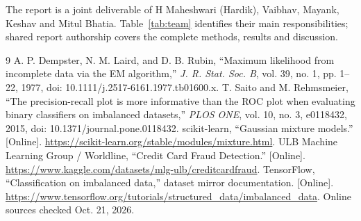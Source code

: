 \documentclass[conference]{IEEEtran}
\begin{document}
The report is a joint deliverable of H Maheshwari (Hardik), Vaibhav, Mayank, Keshav and Mitul Bhatia. Table~\ref{tab:team} identifies their main responsibilities; shared report authorship covers the complete methods, results and discussion.

\newpage
\begin{thebibliography}{9}
 A. P. Dempster, N. M. Laird, and D. B. Rubin, ``Maximum likelihood from incomplete data via the EM algorithm,'' \emph{J. R. Stat. Soc. B}, vol. 39, no. 1, pp. 1--22, 1977, doi: 10.1111/j.2517-6161.1977.tb01600.x.
 T. Saito and M. Rehmsmeier, ``The precision-recall plot is more informative than the ROC plot when evaluating binary classifiers on imbalanced datasets,'' \emph{PLOS ONE}, vol. 10, no. 3, e0118432, 2015, doi: 10.1371/journal.pone.0118432.
 scikit-learn, ``Gaussian mixture models.'' [Online]. \url{https://scikit-learn.org/stable/modules/mixture.html}.
 ULB Machine Learning Group / Worldline, ``Credit Card Fraud Detection.'' [Online]. \url{https://www.kaggle.com/datasets/mlg-ulb/creditcardfraud}.
 TensorFlow, ``Classification on imbalanced data,'' dataset mirror documentation. [Online]. \url{https://www.tensorflow.org/tutorials/structured_data/imbalanced_data}. Online sources checked Oct. 21, 2026.
\end{thebibliography}
\end{document}
